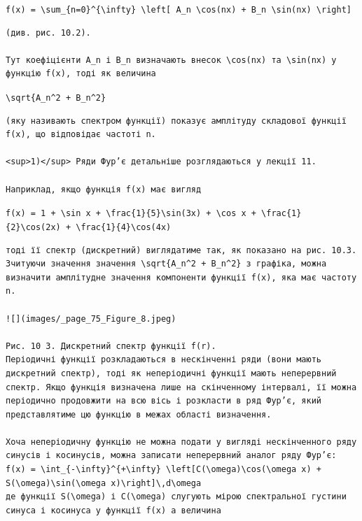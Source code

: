 \documentclass[
  ukrainian,
]{article}
\begin{document}
\texttt{f(x)\ =\ \textbackslash{}sum\_\{n=0\}\^{}\{\textbackslash{}infty\}\ \textbackslash{}left{[}\ A\_n\ \textbackslash{}cos(nx)\ +\ B\_n\ \textbackslash{}sin(nx)\ \textbackslash{}right{]}}

\begin{verbatim}
(див. рис. 10.2).  

Тут коефіцієнти A_n і B_n визначають внесок \cos(nx) та \sin(nx) у функцію f(x), тоді як величина
\end{verbatim}

\texttt{\textbackslash{}sqrt\{A\_n\^{}2\ +\ B\_n\^{}2\}}

\begin{verbatim}
(яку називають спектром функції) показує амплітуду складової функції f(x), що відповідає частоті n.  

<sup>1)</sup> Ряди Фур’є детальніше розглядаються у лекції 11.  

Наприклад, якщо функція f(x) має вигляд
\end{verbatim}

\texttt{f(x)\ =\ 1\ +\ \textbackslash{}sin\ x\ +\ \textbackslash{}frac\{1\}\{5\}\textbackslash{}sin(3x)\ +\ \textbackslash{}cos\ x\ +\ \textbackslash{}frac\{1\}\{2\}\textbackslash{}cos(2x)\ +\ \textbackslash{}frac\{1\}\{4\}\textbackslash{}cos(4x)}

\begin{verbatim}
тоді її спектр (дискретний) виглядатиме так, як показано на рис. 10.3.
Зчитуючи значення значення \sqrt{A_n^2 + B_n^2} з графіка, можна визначити амплітудне значення компоненти функції f(x), яка має частоту n.

![](images/_page_75_Figure_8.jpeg)

Рис. 10 3. Дискретний спектр функції f(r).
Періодичні функції розкладаються в нескінченні ряди (вони мають дискретний спектр), тоді як неперіодичні функції мають неперервний спектр. Якщо функція визначена лише на скінченному інтервалі, її можна періодично продовжити на всю вісь і розкласти в ряд Фур’є, який представлятиме цю функцію в межах області визначення.

Хоча неперіодичну функцію не можна подати у вигляді нескінченного ряду синусів і косинусів, можна записати неперервний аналог ряду Фур’є:
f(x) = \int_{-\infty}^{+\infty} \left[C(\omega)\cos(\omega x) + S(\omega)\sin(\omega x)\right]\,d\omega
де функції S(\omega) і C(\omega) слугують мірою спектральної густини синуса і косинуса у функції f(x) а величина
\end{verbatim}
\end{document}
